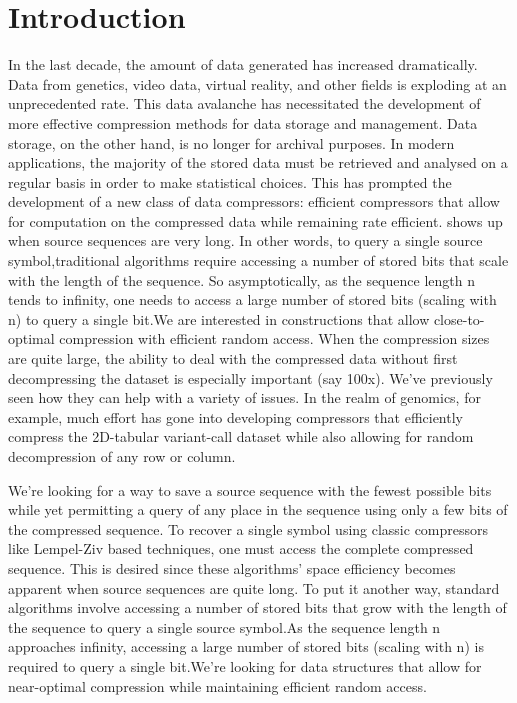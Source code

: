 \section{Introduction}
In the last decade, the amount of data generated has increased dramatically. Data from genetics, video data, virtual reality, and other fields is exploding at an unprecedented rate. This data avalanche has necessitated the development of more effective compression methods for data storage and management. Data storage, on the other hand, is no longer for archival purposes. In modern applications, the majority of the stored data must be retrieved and analysed on a regular basis in order to make statistical choices. This has prompted the development of a new class of data compressors: efficient compressors that allow for computation on the compressed data while remaining rate efficient. shows up when source sequences are very long. In other words, to query a single source symbol,traditional algorithms require accessing a number of stored bits that scale with the length of the sequence. So asymptotically, as the sequence length n tends to infinity, one needs to access a large number of stored bits (scaling with n) to query a single bit.We are interested in constructions that allow close-to-optimal compression with efficient random access. When the compression sizes are quite large, the ability to deal with the compressed data without first decompressing the dataset is especially important (say 100x). We've previously seen how they can help with a variety of issues. In the realm of genomics, for example, much effort has gone into developing compressors that efficiently compress the 2D-tabular variant-call dataset while also allowing for random decompression of any row or column.

We're looking for a way to save a source sequence with the fewest possible bits while yet permitting a query of any place in the sequence using only a few bits of the compressed sequence. To recover a single symbol using classic compressors like Lempel-Ziv based techniques, one must access the complete compressed sequence. This is desired since these algorithms' space efficiency becomes apparent when source sequences are quite long. To put it another way, standard algorithms involve accessing a number of stored bits that grow with the length of the sequence to query a single source symbol.As the sequence length n approaches infinity, accessing a large number of stored bits (scaling with n) is required to query a single bit.We're looking for data structures that allow for near-optimal compression while maintaining efficient random access.